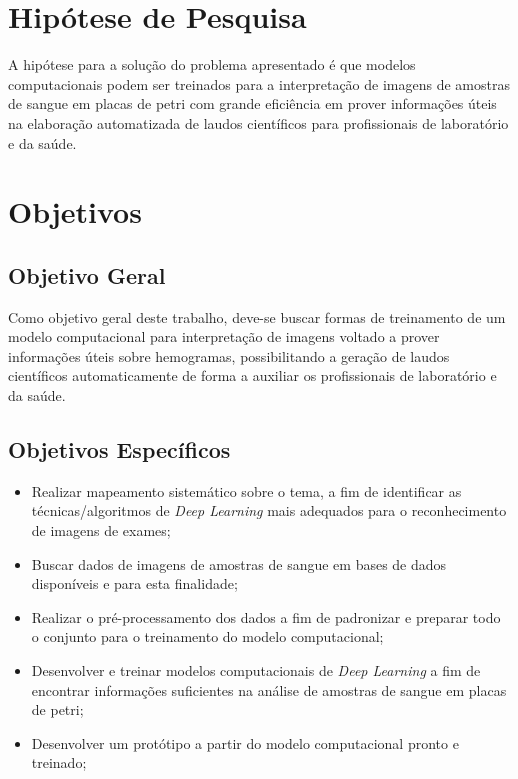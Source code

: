 \section{Hipótese de Pesquisa}
\label{sec:hipotese}

A hipótese para a solução do problema apresentado é que modelos computacionais podem ser treinados para a interpretação de imagens de amostras de sangue em placas de petri com grande eficiência em prover informações úteis na elaboração automatizada de laudos científicos para profissionais de laboratório e da saúde.


\section{Objetivos}
\label{sec:objetivos}

\subsection{Objetivo Geral}
Como objetivo geral deste trabalho, deve-se buscar formas de treinamento de um modelo computacional para interpretação de imagens voltado a prover informações úteis sobre hemogramas, possibilitando a geração de laudos científicos automaticamente de forma a auxiliar os profissionais de laboratório e da saúde.


\subsection{Objetivos Específicos}
\begin{itemize}
\item Realizar mapeamento sistemático sobre o tema, a fim de identificar as técnicas/algoritmos de \emph{Deep Learning} mais adequados para o reconhecimento de imagens de exames;
\item Buscar dados de imagens de amostras de sangue em bases de dados disponíveis e para esta finalidade;
\item Realizar o pré-processamento dos dados a fim de padronizar e preparar todo o conjunto para o treinamento do modelo computacional;
\item Desenvolver e treinar modelos computacionais de \emph{Deep Learning} a fim de encontrar informações suficientes na análise de amostras de sangue em placas de petri;
\item Desenvolver um protótipo a partir do modelo computacional pronto e treinado;
\end{itemize}

